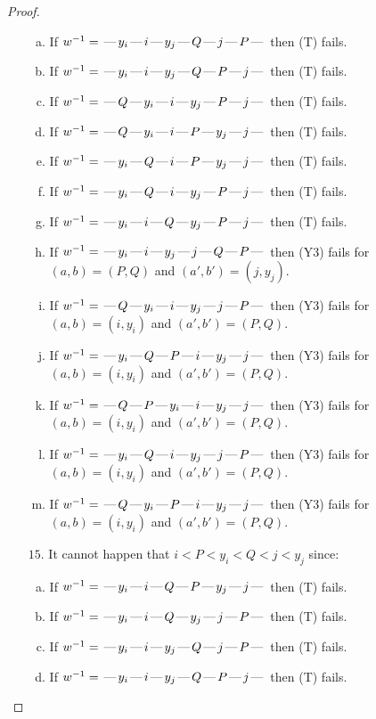 \documentclass[10pt]{article}
\theoremstyle{definition}
\theoremstyle{definition}
\def\dash{\text{\hspace{0.5mm}---\hspace{0.5mm}}}
\begin{document}
\begin{proof}
\begin{enumerate}
\begin{enumerate}[(a)]
\item If $w^{-1} = \dash y_i\dash i\dash y_j\dash Q\dash j\dash P\dash $ then (T) fails.
\item If $w^{-1} = \dash y_i\dash i\dash y_j\dash Q\dash P\dash j\dash $ then (T) fails.
\item If $w^{-1} = \dash Q\dash y_i\dash i\dash y_j\dash P\dash j\dash $ then (T) fails.
\item If $w^{-1} = \dash Q\dash y_i\dash i\dash P\dash y_j\dash j\dash $ then (T) fails.
\item If $w^{-1} = \dash y_i\dash Q\dash i\dash P\dash y_j\dash j\dash $ then (T) fails.
\item If $w^{-1} = \dash y_i\dash Q\dash i\dash y_j\dash P\dash j\dash $ then (T) fails.
\item If $w^{-1} = \dash y_i\dash i\dash Q\dash y_j\dash P\dash j\dash $ then (T) fails.
\item If $w^{-1} = \dash y_i\dash i\dash y_j\dash j\dash Q\dash P\dash $ then (Y3) fails for $(a,b)=(P,Q)$ and $(a',b')=(j,y_j)$.
\item If $w^{-1} = \dash Q\dash y_i\dash i\dash y_j\dash j\dash P\dash $ then (Y3) fails for $(a,b)=(i,y_i)$ and $(a',b')=(P,Q)$.
\item If $w^{-1} = \dash y_i\dash Q\dash P\dash i\dash y_j\dash j\dash $ then (Y3) fails for $(a,b)=(i,y_i)$ and $(a',b')=(P,Q)$.
\item If $w^{-1} = \dash Q\dash P\dash y_i\dash i\dash y_j\dash j\dash $ then (Y3) fails for $(a,b)=(i,y_i)$ and $(a',b')=(P,Q)$.
\item If $w^{-1} = \dash y_i\dash Q\dash i\dash y_j\dash j\dash P\dash $ then (Y3) fails for $(a,b)=(i,y_i)$ and $(a',b')=(P,Q)$.
\item If $w^{-1} = \dash Q\dash y_i\dash P\dash i\dash y_j\dash j\dash $ then (Y3) fails for $(a,b)=(i,y_i)$ and $(a',b')=(P,Q)$.
\end{enumerate}
\item[$15$.] It cannot happen that $i < P < y_i < Q < j < y_j$ since:
\begin{enumerate}[(a)]
\item If $w^{-1} = \dash y_i\dash i\dash Q\dash P\dash y_j\dash j\dash $ then (T) fails.
\item If $w^{-1} = \dash y_i\dash i\dash Q\dash y_j\dash j\dash P\dash $ then (T) fails.
\item If $w^{-1} = \dash y_i\dash i\dash y_j\dash Q\dash j\dash P\dash $ then (T) fails.
\item If $w^{-1} = \dash y_i\dash i\dash y_j\dash Q\dash P\dash j\dash $ then (T) fails.

\end{enumerate}
\end{enumerate}
\end{proof}
\end{document}
